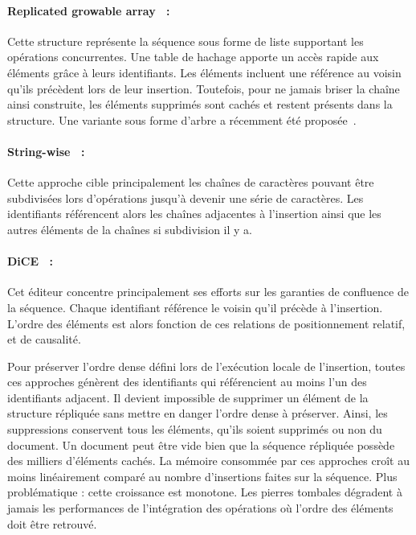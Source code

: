 \paragraph{Replicated growable array~\cite{roh2011replicated} :} Cette structure
représente la séquence sous forme de liste supportant les opérations
concurrentes. Une table de hachage apporte un accès rapide aux éléments grâce à
leurs identifiants. Les éléments incluent une référence au voisin qu'ils
précèdent lors de leur insertion. Toutefois, pour ne jamais briser la chaîne
ainsi construite, les éléments supprimés sont cachés et restent présents dans la
structure. Une variante sous forme d'arbre a récemment été
proposée~\cite{attiya2016specification}.

\paragraph{String-wise~\cite{yu2012stringwise} :} Cette approche cible
principalement les chaînes de caractères pouvant être subdivisées lors
d'opérations jusqu'à devenir une série de caractères. Les identifiants
référencent alors les chaînes adjacentes à l'insertion ainsi que les autres
éléments de la chaînes si subdivision il y a. 

\paragraph{DiCE~\cite{conway2014language} :} Cet éditeur concentre
principalement ses efforts sur les garanties de confluence de la
séquence. Chaque identifiant référence le voisin qu'il précède à
l'insertion. L'ordre des éléments est alors fonction de ces relations de
positionnement relatif, et de causalité.

Pour préserver l'ordre dense défini lors de l'exécution locale de l'insertion,
toutes ces approches génèrent des identifiants qui référencient au moins l'un
des identifiants adjacent. Il devient impossible de supprimer un élément de la
structure répliquée sans mettre en danger l'ordre dense à préserver. Ainsi, les
suppressions conservent tous les éléments, qu'ils soient supprimés ou non du
document.  Un document peut être vide bien que la séquence répliquée possède des
milliers d'éléments cachés. La mémoire consommée par ces approches croît au
moins linéairement comparé au nombre d'insertions faites sur la séquence. Plus
problématique : cette croissance est monotone.  Les pierres tombales dégradent à
jamais les performances de l'intégration des opérations où l'ordre des éléments
doit être retrouvé.

